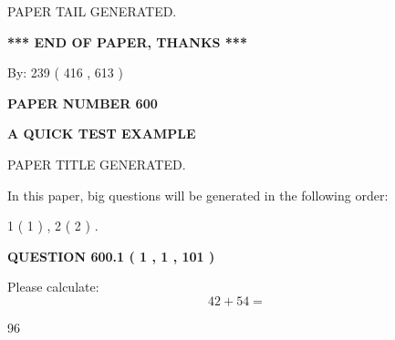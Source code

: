 \documentclass[12pt]{article}
\begin{document}
   
   
\vspace{2.0in} PAPER TAIL GENERATED.
   
   
   
   
\vspace{1.0in} 
{\textbf{\large{ *** END OF PAPER, THANKS *** }}} 
   
   
\hspace{1.0in} By: 
 239 ( 416 ,  613 )
   
   
   
   
\newpage 
\setcounter{page}{ 
   600001 } 
   
   
   
   
 {\textbf{ \Large{ PAPER NUMBER  600  }}}
   
   
\vspace{0.2in}
   
   
   
   
   
   
   
   
 \vspace{0.2in}
{\LARGE {\textbf{ A QUICK TEST EXAMPLE}}}
   
   
 PAPER TITLE GENERATED.
   
   
   
\vspace{0.2in}
   
In this paper, big questions will be generated in the following order: 
   
   
   1 ( 1 )
 ,
   2 ( 2 )
 .
  
\vspace{0.2in}
  
{\textbf{\Large{QUESTION
600.1 
 ( 1 , 1 , 101 )
}}}
  
  
 
Please calculate:
\begin{equation}
42 +  %
54 = \nonumber
\end{equation}
 
 
 
\noindent{}
 
 

96
 
 
\noindent{}
 
 
\end{document}

